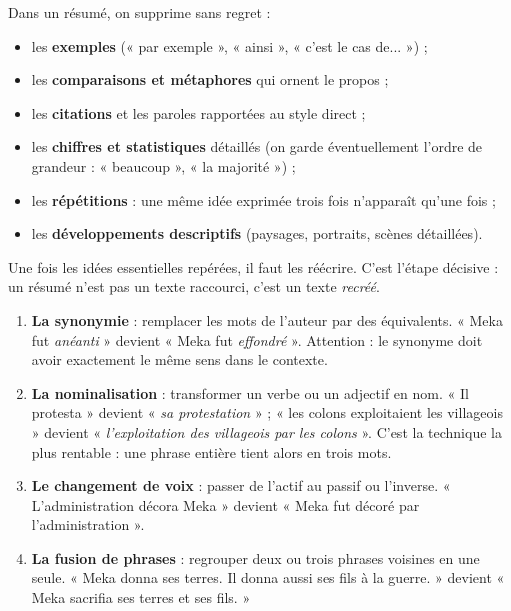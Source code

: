 \documentclass[11pt]{article}
\newcounter{popsec}
\newcounter{popsub}
\newcommand{\courssub}[1]{%
  \stepcounter{popsub}%
  \par\vspace{9pt}\noindent{\popxbold\fontsize{11.5}{13}\selectfont\color{popink}{\color{poporange}\thepopsec.\thepopsub}\hspace{6pt}#1}\par\nopagebreak\vspace{4pt}
}
\begin{document}
\begin{attention}
Dans un résumé, on supprime sans regret :
\begin{itemize}
\item les \textbf{exemples} (« par exemple », « ainsi », « c'est le cas de... ») ;
\item les \textbf{comparaisons et métaphores} qui ornent le propos ;
\item les \textbf{citations} et les paroles rapportées au style direct ;
\item les \textbf{chiffres et statistiques} détaillés (on garde éventuellement l'ordre de grandeur : « beaucoup », « la majorité ») ;
\item les \textbf{répétitions} : une même idée exprimée trois fois n'apparaît qu'une fois ;
\item les \textbf{développements descriptifs} (paysages, portraits, scènes détaillées).
\end{itemize}
\end{attention}

\courssub{Étape 3 : la reformulation}

Une fois les idées essentielles repérées, il faut les réécrire. C'est l'étape décisive : un résumé n'est pas un texte raccourci, c'est un texte \emph{recréé}.

\begin{methode}
\begin{enumerate}
\item \textbf{La synonymie} : remplacer les mots de l'auteur par des équivalents. « Meka fut \emph{anéanti} » devient « Meka fut \emph{effondré} ». Attention : le synonyme doit avoir exactement le même sens dans le contexte.
\item \textbf{La nominalisation} : transformer un verbe ou un adjectif en nom. « Il protesta » devient « \emph{sa protestation} » ; « les colons exploitaient les villageois » devient « \emph{l'exploitation des villageois par les colons} ». C'est la technique la plus rentable : une phrase entière tient alors en trois mots.
\item \textbf{Le changement de voix} : passer de l'actif au passif ou l'inverse. « L'administration décora Meka » devient « Meka fut décoré par l'administration ».
\item \textbf{La fusion de phrases} : regrouper deux ou trois phrases voisines en une seule. « Meka donna ses terres. Il donna aussi ses fils à la guerre. » devient « Meka sacrifia ses terres et ses fils. »
\end{enumerate}
\end{methode}
\end{document}
